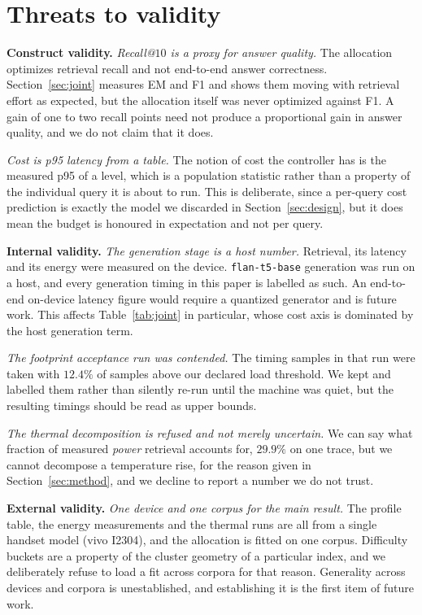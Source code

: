 \documentclass[journal]{IEEEtran}
\begin{document}
\section{Threats to validity}
\label{sec:threats}

\textbf{Construct validity.} \emph{Recall@$10$ is a proxy for answer
quality.} The allocation optimizes retrieval recall and not end-to-end
answer correctness. Section~\ref{sec:joint} measures EM and F1 and shows
them moving with retrieval effort as expected, but the allocation itself
was never optimized against F1. A gain of one to two recall points need not
produce a proportional gain in answer quality, and we do not claim that it
does.

\emph{Cost is p95 latency from a table.} The notion of cost the controller
has is the measured p95 of a level, which is a population statistic rather
than a property of the individual query it is about to run. This is
deliberate, since a per-query cost prediction is exactly the model we
discarded in Section~\ref{sec:design}, but it does mean the budget is
honoured in expectation and not per query.

\textbf{Internal validity.} \emph{The generation stage is a host number.}
Retrieval, its latency and its energy were measured on the device.
\texttt{flan-t5-base} generation was run on a host, and every generation
timing in this paper is labelled as such. An end-to-end on-device latency
figure would require a quantized generator and is future work. This affects
Table~\ref{tab:joint} in particular, whose cost axis is dominated by the
host generation term.

\emph{The footprint acceptance run was contended.} The timing samples in
that run were taken with $12.4\%$ of samples above our declared load
threshold. We kept and labelled them rather than silently re-run until the
machine was quiet, but the resulting timings should be read as upper
bounds.

\emph{The thermal decomposition is refused and not merely uncertain.} We
can say what fraction of measured \emph{power} retrieval accounts for,
$29.9\%$ on one trace, but we cannot decompose a temperature rise, for the
reason given in Section~\ref{sec:method}, and we decline to report a number
we do not trust.

\textbf{External validity.} \emph{One device and one corpus for the main
result.} The profile table, the energy measurements and the thermal runs
are all from a single handset model (vivo I2304), and the allocation is
fitted on one corpus. Difficulty buckets are a property of the cluster
geometry of a particular index, and we deliberately refuse to load a fit
across corpora for that reason. Generality across devices and corpora is
unestablished, and establishing it is the first item of future work.
\end{document}
